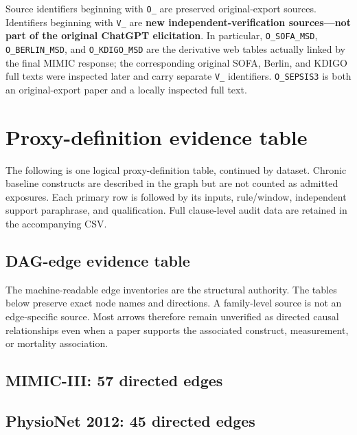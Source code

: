 \documentclass[10pt]{article}
\begin{document}
Source identifiers beginning with \texttt{O\_} are preserved original-export sources.
Identifiers beginning with \texttt{V\_} are
\textbf{new independent-verification sources---not part of the original ChatGPT
elicitation}. In particular, \texttt{O\_SOFA\_MSD},
\texttt{O\_BERLIN\_MSD}, and \texttt{O\_KDIGO\_MSD} are the derivative web tables
actually linked by the final MIMIC response; the corresponding original
SOFA, Berlin, and KDIGO full texts were inspected later and carry separate
\texttt{V\_} identifiers. \texttt{O\_SEPSIS3} is both an original-export paper and
a locally inspected full text.

\section{Proxy-definition evidence table}

The following is one logical proxy-definition table, continued by dataset. Chronic
baseline constructs are described in the graph but are not counted as admitted
exposures. Each primary row is followed by its inputs, rule/window, independent
support paraphrase, and qualification. Full clause-level audit data are retained in
the accompanying CSV.

\begin{landscape}
\footnotesize

\end{landscape}

\begin{landscape}
\section{DAG-edge evidence table}

The machine-readable edge inventories are the structural authority. The tables below
preserve exact node names and directions. A family-level source is not an edge-specific
source. Most arrows therefore remain unverified as directed causal relationships even
when a paper supports the associated construct, measurement, or mortality association.

\subsection{MIMIC-III: 57 directed edges}

\footnotesize


\clearpage
\subsection{PhysioNet 2012: 45 directed edges}

\footnotesize

\end{landscape}
\end{document}
